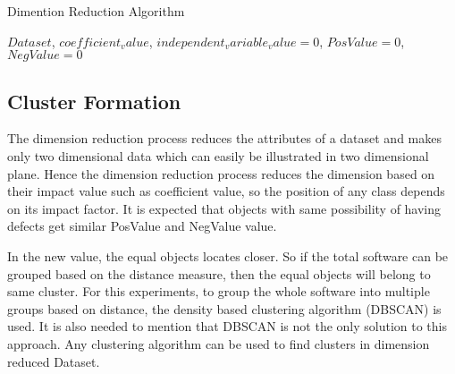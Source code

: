 \documentclass[12pt]{report}
\begin{document}
\begin{algorithm}
\caption{Dimention Reduction Algorithm}
\label{dimention_reduction}
\begin{algorithmic}[1]
\REQUIRE  $ Dataset$, $coefficient_value$, $independent_variable_value=0$, $PosValue=0$,$NegValue=0$ 
		
				
							\ELSE
									
							\ENDIF
				\ENDFOR
				
		\ENDFOR
		

\end{algorithmic}
\end{algorithm}

\subsection{Cluster Formation}

The dimension reduction process reduces the attributes of a dataset and makes only two dimensional data which can easily be illustrated in two dimensional plane. Hence the dimension reduction process reduces the dimension based on their impact value such as coefficient value, so the position of any class depends on its impact factor. It is expected that objects with same possibility of having defects get similar PosValue and NegValue value.
 
In the new value, the equal objects locates closer. So if the total software can be grouped based on the distance measure, then the equal objects will belong to same cluster. For this experiments, to group the whole software into multiple groups based on distance, the density based clustering algorithm (DBSCAN) is used. It is also needed to mention that DBSCAN is not the only solution to this approach. Any clustering algorithm can be used to find clusters in dimension reduced Dataset.
 
\end{document}

